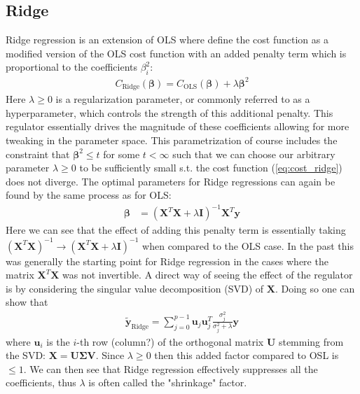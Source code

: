 \documentclass[%
reprint,
amsmath,amssymb,
aps,
pra,
]{revtex4-2}
\begin{document}
\subsection{Ridge}	\label{sec:THEORY_Ridge}
Ridge regression is an extension of OLS where define the cost function as a modified version of the OLS cost function with an added penalty term which is proportional to the coefficients $\beta_i^2$:
\begin{align}
	C_\text{Ridge}(\bm\beta)=C_\text{OLS}(\bm\beta)+\lambda\bm\beta^2
	\label{eq:cost_ridge}
\end{align}
Here $\lambda\geq0$ is a regularization parameter, or commonly referred to as a hyperparameter, which controls the strength of this additional penalty. This regulator essentially drives the magnitude of these coefficients allowing for more tweaking in the parameter space. This parametrization of course includes the constraint that $\bm{\beta}^2\leq t$ for some $t<\infty$ such that we can choose our arbitrary parameter $\lambda\geq0$ to be sufficiently small s.t. the cost function (\ref{eq:cost_ridge}) does not diverge. The optimal parameters for Ridge regressions can again be found by the same process as for OLS:
\begin{align*}
	\bm{\beta}&=(\bm{X}^T\bm{X}+\lambda\bm{I})^{-1}\bm{X}^T\bm{y}
\end{align*}
Here we can see that the effect of adding this penalty term is essentially taking $(\bm X^T\bm X)^{-1}\to(\bm X^T\bm X+\lambda\bm I)^{-1}$ when compared to the OLS case. In the past this was generally the starting point for Ridge regression in the cases where the matrix $\bm X^T\bm X$ was not invertible. A direct way of seeing the effect of the regulator is by considering the singular value decomposition (SVD) of $\bm X$. Doing so one can show that 
\begin{align}
	\tilde{\bm{y}}_\text{Ridge}=\sum_{j=0}^{p-1}\bm{u}_j\bm{u}_j^T\frac{\sigma_j^2}{\sigma_j^2+\lambda}\bm{y}
	\label{eq:beta_ridge}
\end{align}
where $\bm u_i$ is the $i$-th row (column?) of the orthogonal matrix $\bm U$ stemming from the SVD: $\bm X=\bm U\bm \Sigma\bm V$. Since $\lambda\geq0$ then this added factor compared to OSL is $\leq1$. We can then see that Ridge regression effectively suppresses all the coefficients, thus $\lambda$ is often called the "shrinkage" factor. 
\end{document}
